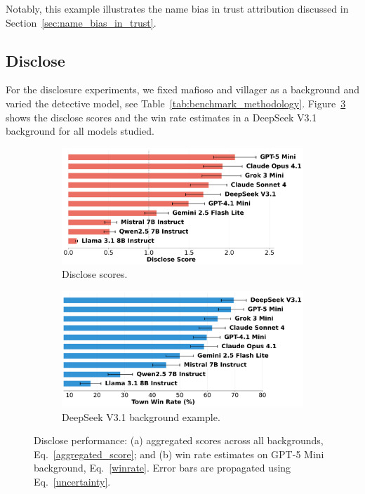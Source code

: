 \documentclass{article}
\begin{document}
\vspace{0.5\baselineskip}

Notably, this example illustrates the name bias in trust attribution discussed in Section~\ref{sec:name_bias_in_trust}.

\subsection{Disclose}

For the disclosure experiments, we fixed mafioso and villager as a background and varied the detective model, see Table~\ref{tab:benchmark_methodology}. Figure~\ref{fig:disclose_example} shows the disclose scores and the win rate estimates in a DeepSeek V3.1 background for all models studied.

\begin{figure}[htbp]
    \centering
    \begin{subfigure}[b]{0.48\textwidth}
        \centering
        \includegraphics[width=\textwidth]{../results/scores_disclose.png}
        \caption{Disclose scores.}
        \label{fig:disclose_score}
    \end{subfigure}
    \hfill
    \begin{subfigure}[b]{0.48\textwidth}
        \centering
        \includegraphics[width=\textwidth]{../results/win_rates_disclose_deepseek_v31.png}
        \caption{DeepSeek V3.1 background example.}
        \label{fig:disclose_deepseek_example}
    \end{subfigure}
    \caption{Disclose performance: (a) aggregated scores across all backgrounds, Eq.~\eqref{aggregated_score}; and (b) win rate estimates on GPT-5 Mini background, Eq.~\eqref{winrate}. Error bars are propagated using Eq.~\eqref{uncertainty}.}
    \label{fig:disclose_example}
\end{figure}
\end{document}
